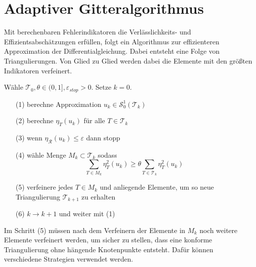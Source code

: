 \chapter{Adaptiver Gitteralgorithmus}
Mit berechenbaren Fehlerindikatoren die Verlässlichkeits- und Effizientsabschätzungen erfüllen, folgt ein Algorithmus zur effizienteren Approximation der Differentialgleichung. Dabei entsteht eine Folge von Triangulierungen. Von Glied zu Glied werden dabei die Elemente mit den größten Indikatoren verfeinert.
\begin{algorithmus}
	Wähle $\mathscr{T}_0, \theta\in (0,1],\varepsilon_{stop}>0$. Setze $k=0$.
	\begin{itemize}
		\item[(1)] berechne Approximation $u_k\in\mathscr{S}_0^1(\mathscr{T}_k)$
		\item[(2)] berechne $\eta_T(u_k)$ für alle $T\in\mathscr{T}_k$
		\item[(3)] wenn $\eta_{\mathscr{R}}(u_k) \leq \varepsilon$ dann stopp
		\item[(4)] wähle Menge $M_k\subset\mathscr{T}_k$ sodass
		\[ \sum_{T\in M_k} \eta_T^2(u_k) \geq \theta\sum_{T\in\mathscr{T}_k}\eta_T^2(u_k)\]
		\item[(5)] verfeinere jedes $T\in M_k$ und anliegende Elemente, um so neue Triangulierung $\mathscr{T}_{k+1}$ zu erhalten
		\item[(6)] $k \rightarrow k + 1$ und weiter mit (1)
	\end{itemize}
\end{algorithmus}
Im Schritt (5) müssen nach dem Verfeinern der Elemente in $M_k$ noch weitere Elemente verfeinert werden, um sicher zu stellen, dass eine konforme Triangulierung ohne hängende Knotenpunkte entsteht. Dafür können verschiedene Strategien verwendet werden.
